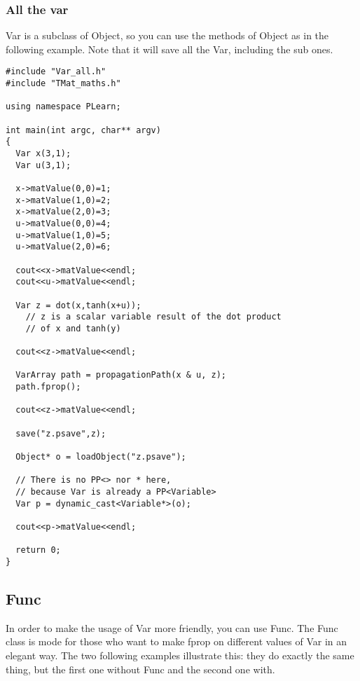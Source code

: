 \documentclass[11pt]{book}
\begin{document}
\subsubsection{All the var}

Var is a subclass of Object, so you can use the methods of Object
as in the following example. Note that it will save all the Var,
including the sub ones.

\begin{verbatim}
#include "Var_all.h"
#include "TMat_maths.h"

using namespace PLearn;

int main(int argc, char** argv)
{
  Var x(3,1);
  Var u(3,1);

  x->matValue(0,0)=1;
  x->matValue(1,0)=2;
  x->matValue(2,0)=3;
  u->matValue(0,0)=4;
  u->matValue(1,0)=5;
  u->matValue(2,0)=6;

  cout<<x->matValue<<endl;
  cout<<u->matValue<<endl;

  Var z = dot(x,tanh(x+u));
    // z is a scalar variable result of the dot product
    // of x and tanh(y)

  cout<<z->matValue<<endl;

  VarArray path = propagationPath(x & u, z);
  path.fprop();

  cout<<z->matValue<<endl;

  save("z.psave",z);

  Object* o = loadObject("z.psave");

  // There is no PP<> nor * here,
  // because Var is already a PP<Variable>
  Var p = dynamic_cast<Variable*>(o);

  cout<<p->matValue<<endl;

  return 0;
}
\end{verbatim}


\subsection{Func}

In order to make the usage of Var more friendly, you can use Func. The Func class is mode for those who want to make fprop on different values of Var in an elegant way. The two following examples illustrate this: they do exactly the same thing, but the first one without Func and the second one with.
\end{document}
